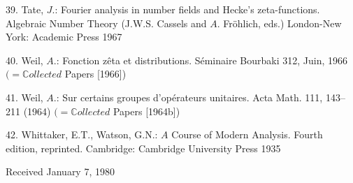 \documentclass[11pt]{article}
\begin{document}
\par
39. Tate, \(J\).: Fourier analysis in number fields and Hecke’s zeta-functions. Algebraic Number Theory (J.W.S. Cassels and \(A\). Fröhlich, eds.) London-New York: Academic Press 1967\par
\par
40. Weil, \(A\).: Fonction zêta et distributions. Séminaire Bourbaki 312, Juin, 1966 \((=\mathbb{C}ollected\) Papers [1966])\par
\par
41. Weil, \(A\).: Sur certains groupes d’opérateurs unitaires. Acta Math. 111, 143--211 (1964) \((=\mathbb{C}ollected\) Papers [1964b])\par
\par
42. Whittaker, E.T., Watson, G.N.: \(A\) Course of Modern Analysis. Fourth edition, reprinted. Cambridge: Cambridge University Press 1935\par
\par
Received January 7, 1980\par
\endgroup
\end{document}
